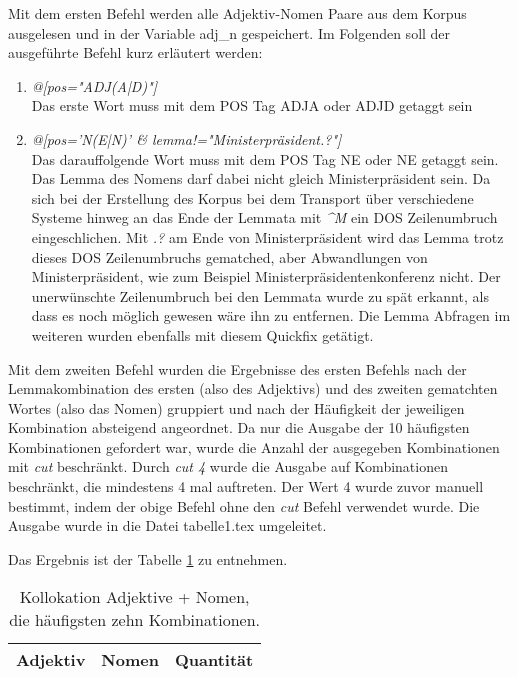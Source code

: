 \documentclass[%
	type=document,%
  	style=article,%
  	media=print,
  	pages=oneside,%
  	prefixLecturer=Dozenten:,
  	author=multiple,
]{unihildesheim}
\begin{document}
Mit dem ersten Befehl werden alle Adjektiv-Nomen Paare aus dem Korpus ausgelesen
und in der Variable adj\_n gespeichert. Im Folgenden soll der ausgeführte Befehl
kurz erläutert werden:
\begin{enumerate}
  \item \textit{@[pos="ADJ(A|D)"]} \\
			Das erste Wort muss mit dem POS Tag ADJA oder ADJD getaggt sein
  \item \textit{@[pos='N(E|N)' \& lemma!="Ministerpräsident.?"]} \\
			Das darauffolgende Wort muss mit dem POS Tag NE oder NE getaggt sein.
			Das Lemma des Nomens darf dabei nicht gleich Ministerpräsident sein. Da sich
			bei der Erstellung des Korpus bei dem Transport über verschiedene Systeme
			hinweg an das Ende der Lemmata mit \textit{\textasciicircum M} ein DOS
			Zeilenumbruch eingeschlichen. Mit \textit{.?} am Ende von Ministerpräsident wird das Lemma
			trotz dieses DOS Zeilenumbruchs gematched, aber Abwandlungen von
			Ministerpräsident, wie zum Beispiel Ministerpräsidentenkonferenz nicht.
			Der unerwünschte Zeilenumbruch bei den Lemmata wurde zu spät erkannt, als
			dass es noch möglich gewesen wäre ihn zu entfernen. Die Lemma Abfragen im
			weiteren wurden ebenfalls mit diesem Quickfix getätigt.
\end{enumerate}

Mit dem zweiten Befehl wurden die Ergebnisse des ersten Befehls nach der
Lemmakombination des ersten (also des Adjektivs) und des zweiten gematchten
Wortes (also das Nomen) gruppiert und nach der Häufigkeit der jeweiligen
Kombination absteigend angeordnet. Da nur die Ausgabe der 10 häufigsten
Kombinationen gefordert war, wurde die Anzahl der ausgegeben Kombinationen
mit \textit{cut} beschränkt. Durch \textit{cut 4} wurde die Ausgabe auf Kombinationen
beschränkt, die mindestens 4 mal auftreten. Der Wert 4 wurde zuvor manuell
bestimmt, indem der obige Befehl ohne den \textit{cut} Befehl verwendet wurde. Die
Ausgabe wurde in die Datei tabelle1.tex umgeleitet.

Das Ergebnis ist der Tabelle \ref{tab:adjektive_nomina} zu entnehmen.

\begin{table}[htpb]\label{t}
	\center
	\begin{tabularx}{0.6\textwidth}{llr}
		\toprule
		\textbf{Adjektiv} & \textbf{Nomen} & \textbf{Quantität}\\
		\midrule
		
		\bottomrule
	\end{tabularx}
	\caption{Kollokation Adjektive + Nomen, die häufigsten zehn Kombinationen.}
	\label{tab:adjektive_nomina}
\end{table}
\end{document}
